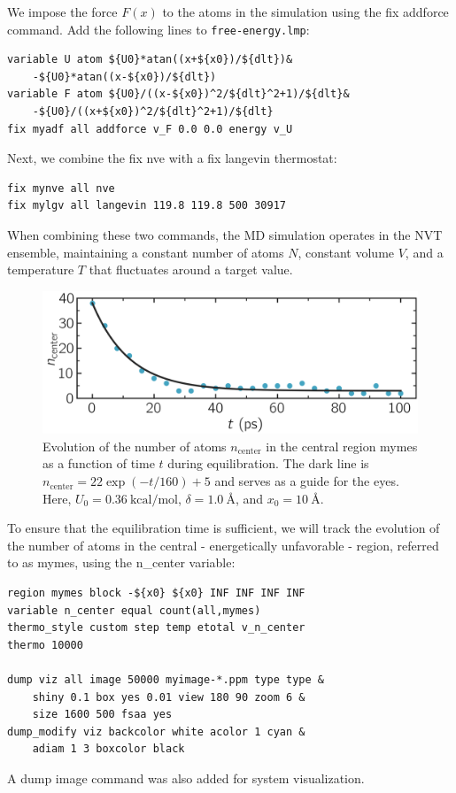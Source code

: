 \documentclass[9pt,tutorial]{livecoms}
\newcommand{\lmpcmd}[1]{\colorbox{listing}{\textcolor{command}{\small{#1}}}} %
\newcommand{\flecmd}[1]{\textcolor{command}{\texttt{#1}}} %
\begin{document}
We impose the force $F(x)$ to the atoms in the simulation
using the \lmpcmd{fix addforce} command.  Add the following
lines to \flecmd{free-energy.lmp}:
\begin{lstlisting}
variable U atom ${U0}*atan((x+${x0})/${dlt})&
    -${U0}*atan((x-${x0})/${dlt})
variable F atom ${U0}/((x-${x0})^2/${dlt}^2+1)/${dlt}&
    -${U0}/((x+${x0})^2/${dlt}^2+1)/${dlt}
fix myadf all addforce v_F 0.0 0.0 energy v_U
\end{lstlisting}
Next, we combine the \lmpcmd{fix nve} with a \lmpcmd{fix langevin} thermostat:
\begin{lstlisting}
fix mynve all nve
fix mylgv all langevin 119.8 119.8 500 30917
\end{lstlisting}
When combining these two commands, the MD simulation operates
in the NVT ensemble, maintaining a constant number of
atoms $N$, constant volume $V$, and a temperature $T$ that
fluctuates around a target value.

\begin{figure}
\centering
\includegraphics[width=\linewidth]{US-density-evolution}
\caption{Evolution of the number of atoms $n_\text{center}$ in the central
region \lmpcmd{mymes} as a function of time $t$ during equilibration.  The dark line
is $n_\text{center} = 22 \exp(-t/160)+5$ and serves as a guide for the eyes.
Here, $U_0 = 0.36~\text{kcal/mol}$, $\delta = 1.0~\text{\AA{}}$, and $x_0 = 10~\text{\AA{}}$.}
\label{fig:US-density-evolution}
\end{figure}

To ensure that the equilibration time is sufficient, we will track the evolution of
the number of atoms in the central - energetically unfavorable - region,
referred to as \lmpcmd{mymes}, using the \lmpcmd{n\_center} variable:
\begin{lstlisting}
region mymes block -${x0} ${x0} INF INF INF INF
variable n_center equal count(all,mymes)
thermo_style custom step temp etotal v_n_center
thermo 10000

dump viz all image 50000 myimage-*.ppm type type &
    shiny 0.1 box yes 0.01 view 180 90 zoom 6 &
    size 1600 500 fsaa yes
dump_modify viz backcolor white acolor 1 cyan &
    adiam 1 3 boxcolor black
\end{lstlisting}
A \lmpcmd{dump image} command was also added for system visualization.
\end{document}
